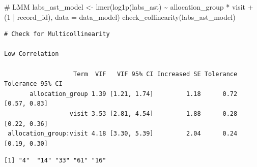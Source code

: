 \documentclass[
  12pt,
]{article}
\newenvironment{Shaded}{\begin{snugshade}}{\end{snugshade}}
\newcommand{\AttributeTok}[1]{\textcolor[rgb]{0.40,0.45,0.13}{#1}}
\newcommand{\CommentTok}[1]{\textcolor[rgb]{0.37,0.37,0.37}{#1}}
\newcommand{\DecValTok}[1]{\textcolor[rgb]{0.68,0.00,0.00}{#1}}
\newcommand{\FunctionTok}[1]{\textcolor[rgb]{0.28,0.35,0.67}{#1}}
\newcommand{\NormalTok}[1]{\textcolor[rgb]{0.00,0.23,0.31}{#1}}
\newcommand{\OtherTok}[1]{\textcolor[rgb]{0.00,0.23,0.31}{#1}}
\newcommand{\SpecialCharTok}[1]{\textcolor[rgb]{0.37,0.37,0.37}{#1}}
\newcommand{\StringTok}[1]{\textcolor[rgb]{0.13,0.47,0.30}{#1}}
\begin{document}
\begin{Shaded}
\begin{Highlighting}[]
\CommentTok{\# LMM}
\NormalTok{labs\_ast\_model }\OtherTok{\textless{}{-}} \FunctionTok{lmer}\NormalTok{(}\FunctionTok{log1p}\NormalTok{(labs\_ast) }\SpecialCharTok{\textasciitilde{}}\NormalTok{ allocation\_group }\SpecialCharTok{*}\NormalTok{ visit }\SpecialCharTok{+} 
\NormalTok{(}\DecValTok{1} \SpecialCharTok{|}\NormalTok{ record\_id), }\AttributeTok{data =}\NormalTok{ data\_model)}
\FunctionTok{check\_collinearity}\NormalTok{(labs\_ast\_model)}
\end{Highlighting}
\end{Shaded}

\begin{verbatim}
# Check for Multicollinearity

Low Correlation

                   Term  VIF   VIF 95% CI Increased SE Tolerance Tolerance 95% CI
       allocation_group 1.39 [1.21, 1.74]         1.18      0.72     [0.57, 0.83]
                  visit 3.53 [2.81, 4.54]         1.88      0.28     [0.22, 0.36]
 allocation_group:visit 4.18 [3.30, 5.39]         2.04      0.24     [0.19, 0.30]
\end{verbatim}

\begin{Shaded}
\end{Shaded}

\begin{verbatim}
[1] "4"  "14" "33" "61" "16"
\end{verbatim}
\end{document}
